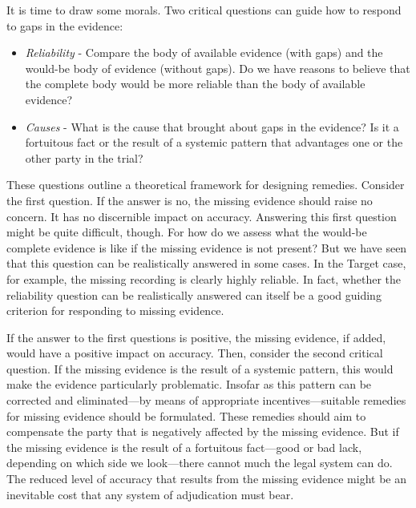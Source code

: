 \documentclass[
  10pt,
  dvipsnames,enabledeprecatedfontcommands]{scrartcl}
\begin{document}
\label{sec:end}

It is time to draw some morals. Two critical questions can guide how to
respond to gaps in the evidence:

\begin{itemize}

\item[] \textit{Reliability} - Compare the body of available evidence (with gaps) and the would-be body of evidence (without gaps). Do we have reasons to believe that the complete body would be more reliable than the body of available evidence? 

\item[] \textit{Causes} - What is the cause that brought about gaps in the evidence? Is it a fortuitous fact or the result of a systemic pattern that advantages one or the other party in the trial? 

\end{itemize}

\noindent These questions outline a theoretical framework for designing
remedies. Consider the first question. If the answer is no, the missing
evidence should raise no concern. It has no discernible impact on
accuracy. Answering this first question might be quite difficult,
though. For how do we assess what the would-be complete evidence is like
if the missing evidence is not present? But we have seen that this
question can be realistically answered in some cases. In the Target
case, for example, the missing recording is clearly highly reliable. In
fact, whether the reliability question can be realistically answered can
itself be a good guiding criterion for responding to missing evidence.

If the answer to the first questions is positive, the missing evidence,
if added, would have a positive impact on accuracy. Then, consider the
second critical question. If the missing evidence is the result of a
systemic pattern, this would make the evidence particularly problematic.
Insofar as this pattern can be corrected and eliminated---by means of
appropriate incentives---suitable remedies for missing evidence should
be formulated. These remedies should aim to compensate the party that is
negatively affected by the missing evidence. But if the missing evidence
is the result of a fortuitous fact---good or bad lack, depending on
which side we look---there cannot much the legal system can do. The
reduced level of accuracy that results from the missing evidence might
be an inevitable cost that any system of adjudication must bear.
\end{document}
